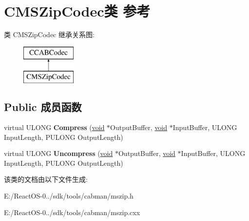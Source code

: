 \hypertarget{class_c_m_s_zip_codec}{}\section{C\+M\+S\+Zip\+Codec类 参考}
\label{class_c_m_s_zip_codec}
类 C\+M\+S\+Zip\+Codec 继承关系图\+:\begin{figure}[H]
\begin{center}
\leavevmode
\includegraphics[height=2.000000cm]{class_c_m_s_zip_codec}
\end{center}
\end{figure}
\subsection*{Public 成员函数}
\begin{DoxyCompactItemize}
\item 
\mbox{\label{class_c_m_s_zip_codec_abcb76c4cc663459e492bcf1d103469e9}} 
virtual U\+L\+O\+NG {\bfseries Compress} (\hyperlink{interfacevoid}{void} $\ast$Output\+Buffer, \hyperlink{interfacevoid}{void} $\ast$Input\+Buffer, U\+L\+O\+NG Input\+Length, P\+U\+L\+O\+NG Output\+Length)
\item 
\mbox{\label{class_c_m_s_zip_codec_a1bcfcf0c3795999d167975f65b49e27b}} 
virtual U\+L\+O\+NG {\bfseries Uncompress} (\hyperlink{interfacevoid}{void} $\ast$Output\+Buffer, \hyperlink{interfacevoid}{void} $\ast$Input\+Buffer, U\+L\+O\+NG Input\+Length, P\+U\+L\+O\+NG Output\+Length)
\end{DoxyCompactItemize}


该类的文档由以下文件生成\+:\begin{DoxyCompactItemize}
\item 
E\+:/\+React\+O\+S-\/0../sdk/tools/cabman/mszip.\+h\item 
E\+:/\+React\+O\+S-\/0../sdk/tools/cabman/mszip.\+cxx\end{DoxyCompactItemize}
